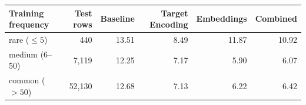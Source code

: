 \begin{tabular}{lrrrrr}
\toprule
Training frequency & Test rows & Baseline & Target Encoding & Embeddings & Combined \\
\midrule
rare ($\le 5$) & 440 & 13.51 & 8.49 & 11.87 & 10.92 \\
medium (6--50) & 7,119 & 12.25 & 7.17 & 5.90 & 6.07 \\
common ($>50$) & 52,130 & 12.68 & 7.13 & 6.22 & 6.42 \\
\bottomrule
\end{tabular}
